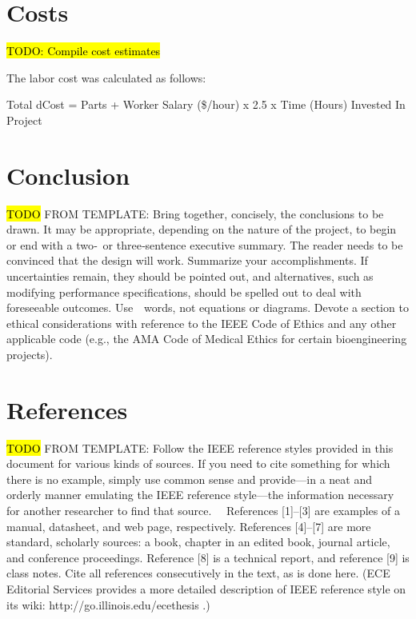 \documentclass[letterpaper,10pt]{article}
\begin{document}
\begin{spacing}{1.15}
\section{Costs}
\hl{TODO: Compile cost estimates}

The labor cost was calculated as follows:

\begin{center}
	Total dCost = Parts + Worker Salary (\$/hour) x 2.5 x Time (Hours) Invested In Project
\end{center}

\section{Conclusion}
\hl{TODO}
FROM TEMPLATE: Bring together, concisely, the conclusions to be drawn. It may be appropriate, depending on the nature of the project, to begin or end with a two‐ or three‐sentence executive summary. The reader needs to be convinced that the design will work. Summarize your accomplishments. If uncertainties remain, they should be pointed out, and alternatives, such as modifying performance specifications, should be spelled out to deal with foreseeable outcomes. Use  words, not equations or diagrams. Devote a section to ethical considerations with reference to the IEEE Code of Ethics and any other applicable code (e.g., the AMA Code of Medical Ethics for certain bioengineering projects).

\section{References}
\hl{TODO}
FROM TEMPLATE: Follow the IEEE reference styles provided in this document for various kinds of sources. If you need to cite something for which there is no example, simply use common sense and provide—in a neat and orderly manner emulating the IEEE reference style—the information necessary for another researcher to find that source.   References [1]–[3] are examples of a manual, datasheet, and web page, respectively. References [4]–[7] are more standard, scholarly sources: a book, chapter in an edited book, journal article, and conference proceedings. Reference [8] is a technical report, and reference [9] is class notes. Cite all references
consecutively in the text, as is done here. (ECE Editorial Services provides a more detailed description of IEEE reference style on its wiki: http://go.illinois.edu/ecethesis .)

\clearpage

\clearpage

\end{spacing}
\end{document}
